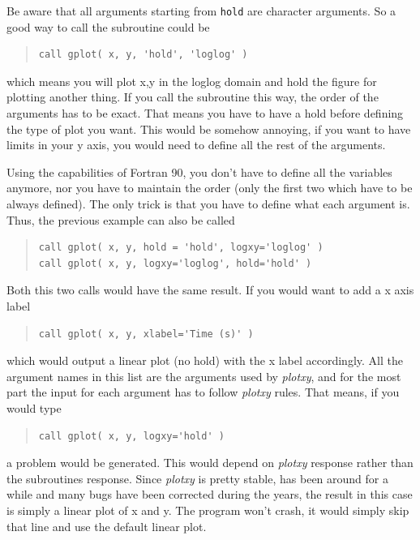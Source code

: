 \documentclass{article}
\begin{document}
Be aware that all arguments starting from \texttt{hold} are character arguments. So a good way to call the subroutine could be
\begin{quote}
\begin{verbatim}
call gplot( x, y, 'hold', 'loglog' )
\end{verbatim}
\end{quote}
which means you will plot x,y in the loglog domain and hold the figure for plotting another thing. If you call the subroutine this way, the order of the arguments has to be exact. That means you have to have a hold before defining the type of plot you want. This would be somehow annoying, if you want to have limits in your y axis, you would need to define all the rest of the arguments. 

Using the capabilities of Fortran 90, you don't have to define all the variables anymore, nor you have to maintain the order (only the first two which have to be always defined). The only trick is that you have to define what each argument is. Thus, the previous example can also be called 
\begin{quote}
\begin{verbatim}
call gplot( x, y, hold = 'hold', logxy='loglog' )
call gplot( x, y, logxy='loglog', hold='hold' )
\end{verbatim}
\end{quote}
Both this two calls would have the same result. If you would want to add a x axis label
\begin{quote}
\begin{verbatim}
call gplot( x, y, xlabel='Time (s)' )
\end{verbatim}
\end{quote}
which would output a linear plot (no hold) with the x label accordingly. All the argument names in this list are the arguments used by {\it plotxy}, and for the most part the input for each argument has to follow {\it plotxy} rules. That means, if you would type 
\begin{quote}
\begin{verbatim}
call gplot( x, y, logxy='hold' )
\end{verbatim}
\end{quote}
a problem would be generated. This would depend on {\it plotxy} response rather than the subroutines response. Since {\it plotxy} is pretty stable, has been around for a while and many bugs have been corrected during the years, the result in this case is simply a linear plot of x and y. The program won't crash, it would simply skip that line and use the default linear plot. 
\end{document}
